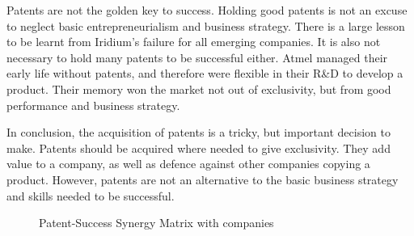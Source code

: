 Patents are not the golden key to success. 
Holding good patents is not an excuse to neglect basic entrepreneurialism and business strategy. 
There is a large lesson to be learnt from Iridium's failure for all emerging companies.
It is also not necessary to hold many patents to be successful either.
Atmel managed their early life without patents, and therefore were flexible in their R\&D to develop a product. 
Their memory won the market not out of exclusivity, but from good performance and business strategy.

In conclusion, the acquisition of patents is a tricky, but important decision to make.
Patents should be acquired where needed to give exclusivity.
They add value to a company, as well as defence against other companies copying a product.
However, patents are not an alternative to the basic business strategy and skills needed to be successful.


\begin{figure}
\caption{Patent-Success Synergy Matrix with companies}
\label{fig:pssm:companies}
\end{figure}

